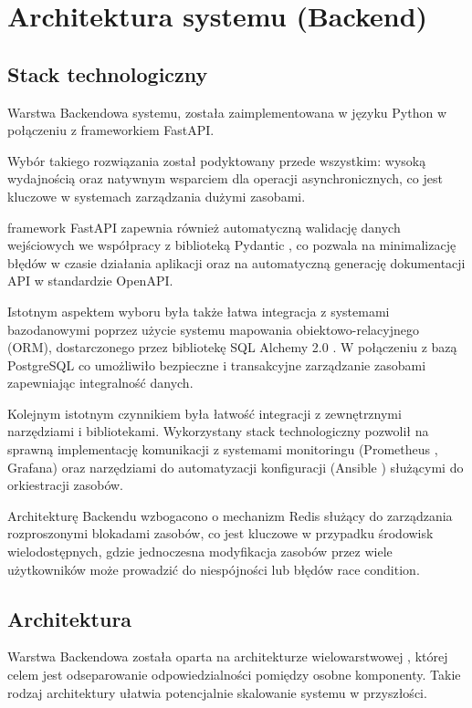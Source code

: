 \chapter{Architektura systemu (Backend)}

\section{Stack technologiczny}
\par Warstwa \gls{Backend}owa systemu, została zaimplementowana w języku Python \cite{python_docs} w połączeniu z \gls{framework}iem \gls{FastAPI}. \cite{fastapi} 
\par Wybór takiego rozwiązania został podyktowany przede wszystkim: wysoką wydajnością oraz natywnym wsparciem dla operacji asynchronicznych, co jest kluczowe w systemach zarządzania dużymi zasobami. 
\par \Gls{framework} \gls{FastAPI} zapewnia również automatyczną walidację danych wejściowych we współpracy z biblioteką \gls{Pydantic} \cite{pydantic}, co pozwala na minimalizację błędów w czasie działania aplikacji oraz na automatyczną generację dokumentacji \gls{API} w standardzie \gls{OpenAPI}.
\par Istotnym aspektem wyboru była także łatwa integracja z systemami bazodanowymi poprzez użycie systemu mapowania obiektowo-relacyjnego (\gls{ORM}), dostarczonego przez bibliotekę \gls{SQL Alchemy} 2.0 \cite{sqlalchemy}. W połączeniu z bazą \gls{PostgreSQL} co umożliwiło bezpieczne i transakcyjne zarządzanie zasobami zapewniając integralność danych.
\par Kolejnym istotnym czynnikiem była łatwość integracji z zewnętrznymi narzędziami i bibliotekami. Wykorzystany stack technologiczny pozwolił na sprawną implementację komunikacji z systemami monitoringu (\gls{Prometheus} \cite{prometheus}, \gls{Grafana}) oraz narzędziami do automatyzacji konfiguracji (\gls{Ansible} \cite{ansible}) służącymi do orkiestracji zasobów.
\par Architekturę \gls{Backend}u wzbogacono o mechanizm \gls{Redis} \cite{redis} służący do zarządzania rozproszonymi blokadami zasobów, co jest kluczowe w przypadku środowisk wielodostępnych, gdzie jednoczesna modyfikacja zasobów przez wiele użytkowników może prowadzić do niespójności lub błędów \gls{race condition}.

\section{Architektura}
\par Warstwa \gls{Backend}owa została oparta na architekturze wielowarstwowej \cite{deviq_layered_architecture}, której celem jest odseparowanie odpowiedzialności pomiędzy osobne komponenty. Takie rodzaj architektury ułatwia potencjalnie skalowanie systemu w przyszłości.

